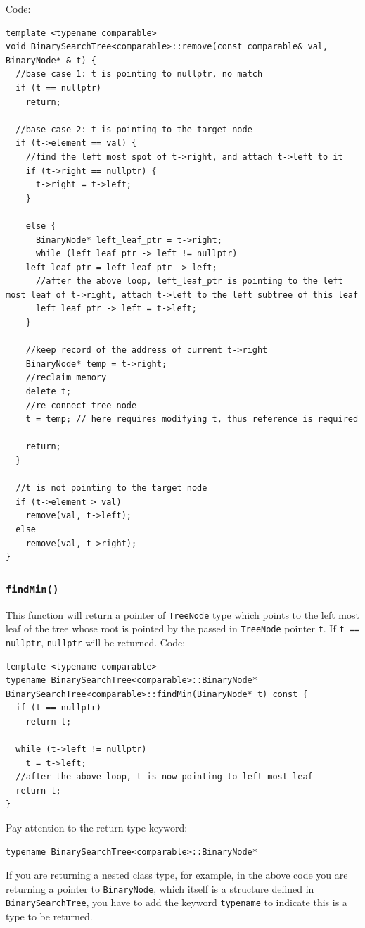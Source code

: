 \documentclass[12pt]{book}
\begin{document}
Code:
\begin{verbatim}
template <typename comparable>
void BinarySearchTree<comparable>::remove(const comparable& val, BinaryNode* & t) {
  //base case 1: t is pointing to nullptr, no match
  if (t == nullptr)
    return;

  //base case 2: t is pointing to the target node
  if (t->element == val) {
    //find the left most spot of t->right, and attach t->left to it
    if (t->right == nullptr) {
      t->right = t->left;
    }

    else {
      BinaryNode* left_leaf_ptr = t->right;
      while (left_leaf_ptr -> left != nullptr)
	left_leaf_ptr = left_leaf_ptr -> left;
      //after the above loop, left_leaf_ptr is pointing to the left most leaf of t->right, attach t->left to the left subtree of this leaf
      left_leaf_ptr -> left = t->left;
    }

    //keep record of the address of current t->right
    BinaryNode* temp = t->right;
    //reclaim memory 
    delete t;
    //re-connect tree node 
    t = temp; // here requires modifying t, thus reference is required

    return;
  }

  //t is not pointing to the target node
  if (t->element > val) 
    remove(val, t->left);
  else
    remove(val, t->right);
}
\end{verbatim}

\subsubsection{\texttt{findMin()}}
\label{sec:orgeb46433}
This function will return a pointer of \texttt{TreeNode} type which points to the left most leaf of the tree whose root is pointed by the passed in \texttt{TreeNode} pointer \texttt{t}. If \texttt{t == nullptr}, \texttt{nullptr} will be returned. Code:
\begin{verbatim}
template <typename comparable>
typename BinarySearchTree<comparable>::BinaryNode* BinarySearchTree<comparable>::findMin(BinaryNode* t) const {
  if (t == nullptr)
    return t;

  while (t->left != nullptr)
    t = t->left;
  //after the above loop, t is now pointing to left-most leaf
  return t;  
}
\end{verbatim}

Pay attention to the return type keyword:
\begin{verbatim}
typename BinarySearchTree<comparable>::BinaryNode*
\end{verbatim}
If you are returning a nested class type, for example, in the above code you are returning a pointer to \texttt{BinaryNode}, which itself is a structure defined in \texttt{BinarySearchTree}, you have to add the keyword \texttt{typename} to indicate this is a type to be returned.
\end{document}
